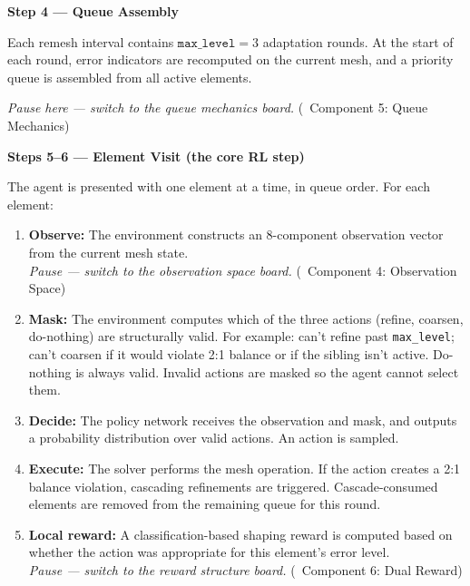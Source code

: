 \documentclass[11pt]{article}
\begin{document}
\vspace{0.4cm}

\noindent\textbf{\textcolor{roundcolor}{Step 4 --- Queue Assembly}}

Each remesh interval contains $\texttt{max\_level} = 3$ adaptation rounds. At the start of each round, error indicators are recomputed on the current mesh, and a priority queue is assembled from all active elements.

\textit{Pause here --- switch to the queue mechanics board.} (\textcolor{calloutcolor}{\textrightarrow~Component 5: Queue Mechanics})

\vspace{0.4cm}

\noindent\textbf{\textcolor{elementcolor}{Steps 5--6 --- Element Visit (the core RL step)}}

The agent is presented with one element at a time, in queue order. For each element:

\begin{enumerate}[leftmargin=1.5em, itemsep=3pt]
    \item \textbf{Observe:} The environment constructs an 8-component observation vector from the current mesh state. \\
    \textit{Pause --- switch to the observation space board.} (\textcolor{calloutcolor}{\textrightarrow~Component 4: Observation Space})
    \item \textbf{Mask:} The environment computes which of the three actions (refine, coarsen, do-nothing) are structurally valid. For example: can't refine past \texttt{max\_level}; can't coarsen if it would violate 2:1 balance or if the sibling isn't active. Do-nothing is always valid. Invalid actions are masked so the agent cannot select them.
    \item \textbf{Decide:} The policy network receives the observation and mask, and outputs a probability distribution over valid actions. An action is sampled.
    \item \textbf{Execute:} The solver performs the mesh operation. If the action creates a 2:1 balance violation, cascading refinements are triggered. Cascade-consumed elements are removed from the remaining queue for this round.
    \item \textbf{Local reward:} A classification-based shaping reward is computed based on whether the action was appropriate for this element's error level. \\
    \textit{Pause --- switch to the reward structure board.} (\textcolor{calloutcolor}{\textrightarrow~Component 6: Dual Reward})
\end{enumerate}
\end{document}

